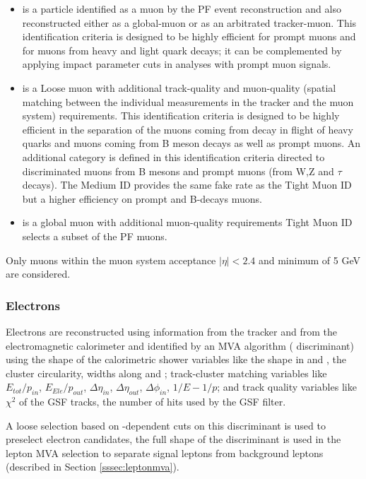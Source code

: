 \begin{itemize}
\item {} is a particle identified as a muon by the PF event reconstruction and also reconstructed either as a global-muon or as an arbitrated tracker-muon. This identification criteria is designed to be highly efficient for prompt muons and for muons from heavy and light quark decays; it can be complemented by applying impact parameter cuts in analyses with prompt muon signals.
\item {} is a Loose muon with additional track-quality and muon-quality (spatial matching between the individual measurements in the tracker and the muon system) requirements. This identification criteria is designed to be highly efficient in the separation of the muons coming from decay in flight of heavy quarks and muons coming from B meson decays as well as prompt muons. An additional category  is defined in this identification criteria directed to discriminated muons from B mesons and prompt muons (from W,Z and $\tau$ decays). The Medium ID provides the same fake rate as the Tight Muon ID but a higher efficiency on prompt and B-decays muons.\cite{medium_muon}
\item {} is a global muon with additional muon-quality requirements Tight Muon ID selects a subset of the PF muons.  
\end{itemize}

Only muons within the muon system acceptance $|\eta| < 2.4$ and minimum \pt  of 5 GeV are considered. %

\subsubsection*{Electrons}

Electrons are reconstructed using information from the tracker and from the electromagnetic calorimeter and identified by an MVA algorithm ( discriminant) using the shape of the calorimetric shower variables like the shape in \etac and \phic, the cluster circularity, widths along \etac and \phic; track-cluster matching variables like $E_{tot}/p_{in}$, $E_{Ele}/p_{out}$, $\Delta \eta_{in}$,  $\Delta \eta_{out}$, $\Delta \phi_{in}$, $1/E - 1/p$; and track quality variables like $\chi^2$ of the GSF tracks, the number of hits used by the GSF filter\cite{mva_eid}.

A loose selection based on \etac-dependent cuts on this discriminant is used to preselect electron candidates, the full shape of the discriminant is used in the lepton MVA selection to separate signal leptons from background leptons (described in Section \ref{sssec:leptonmva}).

